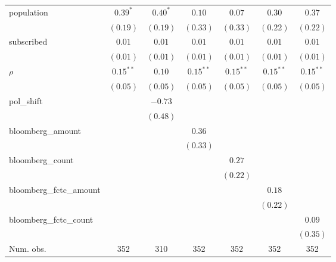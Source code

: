 \begin{table}[!h]
\begin{center}
\begin{tabular}{l c c c c c c }
population              & $0.39^{*}$   & $0.40^{*}$   & $0.10$       & $0.07$       & $0.30$       & $0.37$       \\
                        & $(0.19)$     & $(0.19)$     & $(0.33)$     & $(0.33)$     & $(0.22)$     & $(0.22)$     \\
subscribed              & $0.01$       & $0.01$       & $0.01$       & $0.01$       & $0.01$       & $0.01$       \\
                        & $(0.01)$     & $(0.01)$     & $(0.01)$     & $(0.01)$     & $(0.01)$     & $(0.01)$     \\
$\rho$                  & $0.15^{**}$  & $0.10$       & $0.15^{**}$  & $0.15^{**}$  & $0.15^{**}$  & $0.15^{**}$  \\
                        & $(0.05)$     & $(0.05)$     & $(0.05)$     & $(0.05)$     & $(0.05)$     & $(0.05)$     \\
pol\_shift              &              & $-0.73$      &              &              &              &              \\
                        &              & $(0.48)$     &              &              &              &              \\
bloomberg\_amount       &              &              & $0.36$       &              &              &              \\
                        &              &              & $(0.33)$     &              &              &              \\
bloomberg\_count        &              &              &              & $0.27$       &              &              \\
                        &              &              &              & $(0.22)$     &              &              \\
bloomberg\_fctc\_amount &              &              &              &              & $0.18$       &              \\
                        &              &              &              &              & $(0.22)$     &              \\
bloomberg\_fctc\_count  &              &              &              &              &              & $0.09$       \\
                        &              &              &              &              &              & $(0.35)$     \\
\midrule
Num. obs.               & 352          & 310          & 352          & 352          & 352          & 352          \\

\end{tabular}
\end{center}
\end{table}
